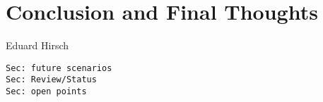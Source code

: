 \chapter{Conclusion and Final Thoughts}
\label{ch:conclusion}

\vspace{-1cm}
\begin{center}
Eduard Hirsch
\end{center}

\begin{verbatim}
Sec: future scenarios
Sec: Review/Status
Sec: open points

\end{verbatim}
